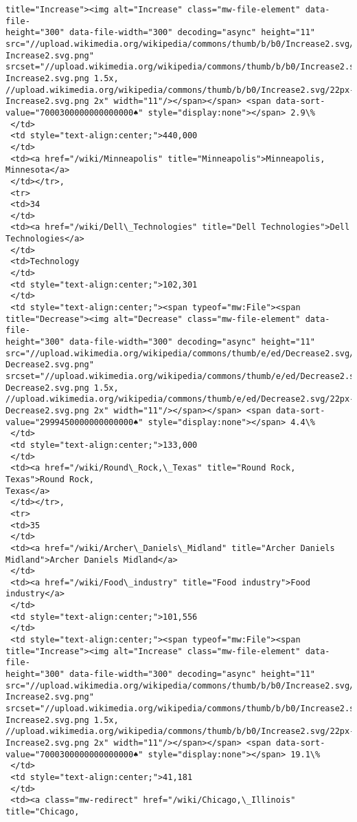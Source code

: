\documentclass[11pt]{article}
\begin{document}
\begin{tcolorbox}[breakable, size=fbox, boxrule=.5pt, pad at break*=1mm, opacityfill=0]
\begin{Verbatim}[commandchars=\\\{\}]
title="Increase"><img alt="Increase" class="mw-file-element" data-file-
height="300" data-file-width="300" decoding="async" height="11"
src="//upload.wikimedia.org/wikipedia/commons/thumb/b/b0/Increase2.svg/11px-
Increase2.svg.png"
srcset="//upload.wikimedia.org/wikipedia/commons/thumb/b/b0/Increase2.svg/17px-
Increase2.svg.png 1.5x,
//upload.wikimedia.org/wikipedia/commons/thumb/b/b0/Increase2.svg/22px-
Increase2.svg.png 2x" width="11"/></span></span> <span data-sort-
value="7000300000000000000♠" style="display:none"></span> 2.9\%
 </td>
 <td style="text-align:center;">440,000
 </td>
 <td><a href="/wiki/Minneapolis" title="Minneapolis">Minneapolis, Minnesota</a>
 </td></tr>,
 <tr>
 <td>34
 </td>
 <td><a href="/wiki/Dell\_Technologies" title="Dell Technologies">Dell
Technologies</a>
 </td>
 <td>Technology
 </td>
 <td style="text-align:center;">102,301
 </td>
 <td style="text-align:center;"><span typeof="mw:File"><span
title="Decrease"><img alt="Decrease" class="mw-file-element" data-file-
height="300" data-file-width="300" decoding="async" height="11"
src="//upload.wikimedia.org/wikipedia/commons/thumb/e/ed/Decrease2.svg/11px-
Decrease2.svg.png"
srcset="//upload.wikimedia.org/wikipedia/commons/thumb/e/ed/Decrease2.svg/17px-
Decrease2.svg.png 1.5x,
//upload.wikimedia.org/wikipedia/commons/thumb/e/ed/Decrease2.svg/22px-
Decrease2.svg.png 2x" width="11"/></span></span> <span data-sort-
value="2999450000000000000♠" style="display:none"></span> 4.4\%
 </td>
 <td style="text-align:center;">133,000
 </td>
 <td><a href="/wiki/Round\_Rock,\_Texas" title="Round Rock, Texas">Round Rock,
Texas</a>
 </td></tr>,
 <tr>
 <td>35
 </td>
 <td><a href="/wiki/Archer\_Daniels\_Midland" title="Archer Daniels
Midland">Archer Daniels Midland</a>
 </td>
 <td><a href="/wiki/Food\_industry" title="Food industry">Food industry</a>
 </td>
 <td style="text-align:center;">101,556
 </td>
 <td style="text-align:center;"><span typeof="mw:File"><span
title="Increase"><img alt="Increase" class="mw-file-element" data-file-
height="300" data-file-width="300" decoding="async" height="11"
src="//upload.wikimedia.org/wikipedia/commons/thumb/b/b0/Increase2.svg/11px-
Increase2.svg.png"
srcset="//upload.wikimedia.org/wikipedia/commons/thumb/b/b0/Increase2.svg/17px-
Increase2.svg.png 1.5x,
//upload.wikimedia.org/wikipedia/commons/thumb/b/b0/Increase2.svg/22px-
Increase2.svg.png 2x" width="11"/></span></span> <span data-sort-
value="7000300000000000000♠" style="display:none"></span> 19.1\%
 </td>
 <td style="text-align:center;">41,181
 </td>
 <td><a class="mw-redirect" href="/wiki/Chicago,\_Illinois" title="Chicago,

\end{Verbatim}
\end{tcolorbox}
\end{document}
